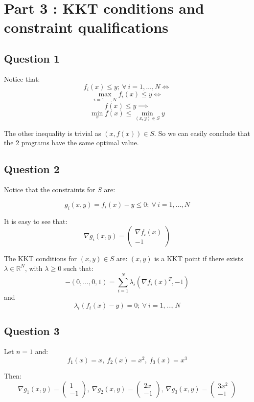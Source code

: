 \documentclass[12p]{article}
\begin{document}
\pagebreak


\section*{Part 3 : KKT conditions and constraint qualifications}

\subsection*{Question 1}\hfil\par
Notice that:
\[f_i(x)\leq y;\ \forall \ i=1,\dots,N\iff\]
\[\max_{i=1,\dots,N}f_i(x)\leq y\iff \]
\[f(x)\leq y \implies \]
\[\min_xf(x)\leq\min_{(x,y)\in S}y\]

The other inequality is trivial as \((x,f(x))\in S\). So we can easily conclude that the 2 programs have the same optimal value.

\subsection*{Question 2}\hfil\par
Notice that the constraints for \(S\) are:

\[
    g_i(x,y)=f_i(x)-y\leq 0;\ \forall \ i=1,\dots,N
\]

It is easy to see that:
\[
    \nabla g_i(x,y)=\begin{pmatrix}
    \nabla f_i(x)\\
     -1
    \end{pmatrix}    
\]

The KKT conditions for \((x,y)\in S\) are: \((x,y)\) is a KKT point if there exists \(\lambda\in\mathbb{R}^N\), with \(\lambda\geq0\) such that:
\[
    -(0,\dots,0,1)=   \sum_{i=1}^{N}\lambda_i(\nabla f_i(x)^T,-1)    
\]
and
\[
    \lambda_i(f_i(x)-y)=0;\ \forall\ i=1,\dots,N  
\]
\subsection*{Question 3}\hfil\par
Let \(n=1\) and:
\[
    f_1(x)=x,\ f_2(x)=x^2,\ f_3(x)=x^3
\]

Then:
\[
  \nabla g_1(x,y)=\begin{pmatrix}
    1\\
     -1
    \end{pmatrix},\ \nabla g_2(x,y)=\begin{pmatrix}
    2x\\
     -1
    \end{pmatrix},\ \nabla g_3(x,y)=\begin{pmatrix}
    3x^2\\
     -1
    \end{pmatrix}
\]
\end{document}
